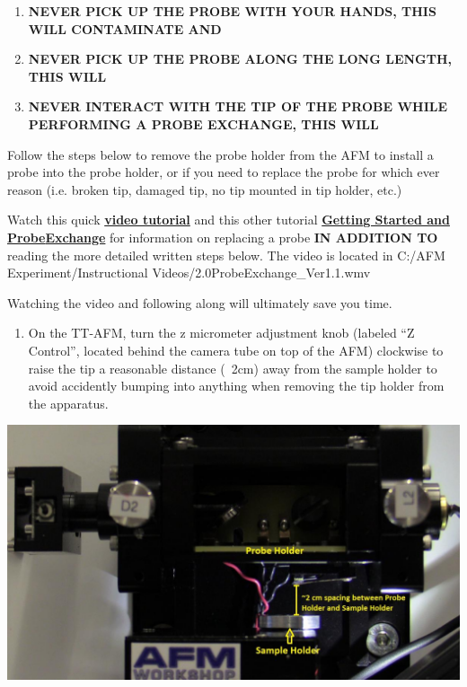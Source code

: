 \documentclass{../lab}
\begin{document}
\begin{enumerate}
    \item \textbf{NEVER PICK UP THE PROBE WITH YOUR HANDS, THIS WILL CONTAMINATE AND }

    \item \textbf{NEVER PICK UP THE PROBE ALONG THE LONG LENGTH, THIS WILL }

    \item \textbf{NEVER INTERACT WITH THE TIP OF THE PROBE WHILE PERFORMING A PROBE EXCHANGE, THIS WILL }
\end{enumerate}

Follow the steps below to remove the probe holder from the AFM to install a probe into the probe holder, or if you need to replace the probe for which ever reason (i.e. broken tip, damaged tip, no tip mounted in tip holder, etc.)

Watch this quick \href{http://experimentationlab.berkeley.edu/sites/default/files/AFMImages/2.0ProbeExchange\_Ver1.1.wmv}{\textbf{video tutorial}} and this other tutorial \href{http://experimentationlab.berkeley.edu/sites/default/files/gettingstarted\_final2.mp4}{\textbf{Getting Started and Probe}}\href{http://experimentationlab.berkeley.edu/sites/default/files/gettingstarted\_final.mp4}{\textbf{Exchange}} for information on replacing a probe \textbf{IN ADDITION TO} reading the more detailed written steps below.  The video is located in C:/AFM Experiment/Instructional Videos/2.0ProbeExchange\_Ver1.1.wmv​

Watching the video and following along will ultimately save you time.

\begin{enumerate}
    \item On the TT-AFM, turn the z micrometer adjustment knob (labeled ``Z Control'', located behind the camera tube on top of the AFM) clockwise to raise the tip a reasonable distance (~2cm) away from the sample holder to avoid accidently bumping into anything when removing the tip holder from the apparatus.

\end{enumerate}

\begin{center}
    \href{http://experimentationlab.berkeley.edu/sites/default/files/AFMImages/AFMstagespace_0.jpg}{\includegraphics[width=0.5\linewidth]{images/AFMstagespace_0.jpg}}
\end{center}
\end{document}
